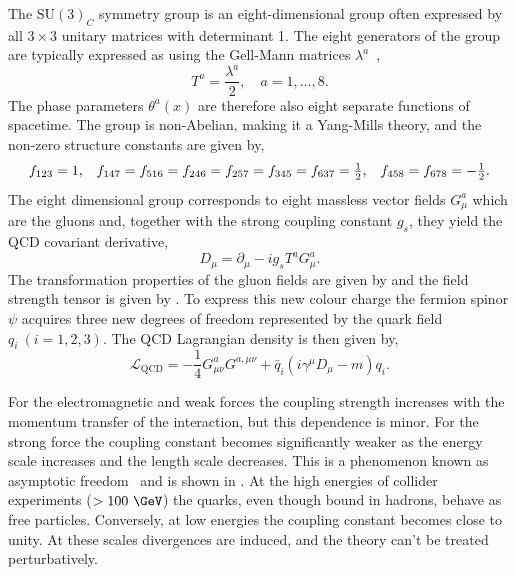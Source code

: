 The $\text{SU}(3)_C$ symmetry group is an eight-dimensional group often expressed by all $3 \times 3$ unitary matrices with determinant 1.
The eight generators of the group are typically expressed as using the Gell-Mann matrices $\lambda^a$~\cite{GellManMatrix},
\begin{equation}
    \label{eq:su3_generators}
    T^a = \frac{\lambda^a}{2}, \quad a = 1, \ldots, 8.
\end{equation}
The phase parameters $\theta^a(x)$ are therefore also eight separate functions of spacetime.
The group is non-Abelian, making it a Yang-Mills theory, and the non-zero structure constants are given by,
\begin{equation}
    \label{eq:qcd_sc}
    \begin{array}{ccc}
        f_{123} = 1 ,                                                            & \hspace{\stretch{1}}
        f_{147} = f_{516} = f_{246} = f_{257} = f_{345} = f_{637} = \frac{1}{2}, & \hspace{\stretch{1}}
        f_{458} = f_{678} = -\frac{1}{2}.
    \end{array}
\end{equation}
The eight dimensional group corresponds to eight massless vector fields $G_\mu^a$ which are the gluons and, together with the strong coupling constant $g_s$, they yield the QCD covariant derivative,
\begin{equation}
    \label{eq:qcd_covariant_derivative}
    D_\mu = \partial_\mu - i g_s T^a G_\mu^a.
\end{equation}
The transformation properties of the gluon fields are given by  and the field strength tensor is given by .
To express this new colour charge the fermion spinor $\psi$ acquires three new degrees of freedom represented by the quark field $q_i\:(i = 1, 2, 3)$.
The QCD Lagrangian density is then given by,
\begin{equation}
    \label{eq:qcd_lagrangian}
    \mathcal{L}_\text{QCD} = -\frac{1}{4} G_{\mu\nu}^a G^{a,\mu\nu} + \bar q_i (i \gamma^\mu D_\mu - m) q_i.
\end{equation}

For the electromagnetic and weak forces the coupling strength increases with the momentum transfer of the interaction, but this dependence is minor.
For the strong force the coupling constant becomes significantly weaker as the energy scale increases and the length scale decreases.
This is a phenomenon known as asymptotic freedom~\cite{PriceAsymptoticFreedom} and is shown in .
At the high energies of collider experiments ($ > 100~\GeV$) the quarks, even though bound in hadrons, behave as free particles.
Conversely, at low energies the coupling constant becomes close to unity.
At these scales divergences are induced, and the theory can't be treated perturbatively.

